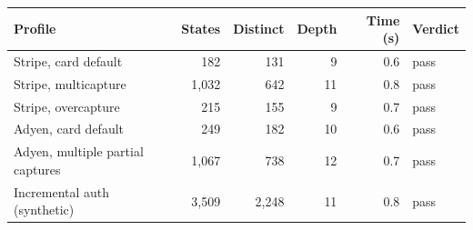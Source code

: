 \begin{tabular}{lrrrrl}
\toprule
Profile & States & Distinct & Depth & Time (s) & Verdict \\
\midrule
Stripe, card default & 182 & 131 & 9 & 0.6 & pass \\
Stripe, multicapture & 1,032 & 642 & 11 & 0.8 & pass \\
Stripe, overcapture & 215 & 155 & 9 & 0.7 & pass \\
Adyen, card default & 249 & 182 & 10 & 0.6 & pass \\
Adyen, multiple partial captures & 1,067 & 738 & 12 & 0.7 & pass \\
Incremental auth (synthetic) & 3,509 & 2,248 & 11 & 0.8 & pass \\
\bottomrule
\end{tabular}
